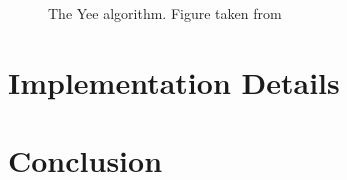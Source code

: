 \documentclass{report}
\begin{document}
\begin{figure}[here]
\centering
\caption{The Yee algorithm. Figure taken from~\cite{JBSchneiderUFDTD}}
\label{Algorithm}
\end{figure}

\chapter{Implementation Details}


\chapter{Conclusion}

\nocite{*}

\end{document}
